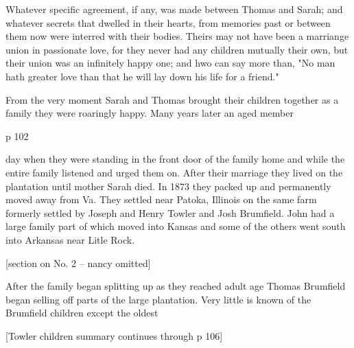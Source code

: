 Whatever specific agreement, if any, was made between Thomas and Sarah; and whatever secrets that dwelled in their hearts, from memories past or between them now were interred with their bodies.  Theirs may not have been a marriange union in passionate love, for they never had any children mutually their own, but their union was an infinitely happy one; and hwo can say more than, "No man hath greater love than that he will lay down his life for a friend."

From the very moment Sarah and Thomas brought their children together as a family they were roaringly happy.  Many years later an aged member



p 102

day when they were standing in the front door of the family home and while the entire family listened and urged them on.  After their marriage they lived on the plantation until mother Sarah died.  In 1873 they packed up and permanently moved away from Va.  They settled near Patoka, Illinois on the same farm formerly settled by Joseph and Henry Towler and Josh Brumfield.  John had a large family part of which moved into Kansas and some of the others went south into Arkansas near Litle Rock.

[section on No. 2 -- nancy omitted]

After the family began splitting up as they reached adult age Thomas Brumfield began selling off parts of the large plantation.  Very little is known of the Brumfield children except the oldest


[Towler children summary continues through p 106]

